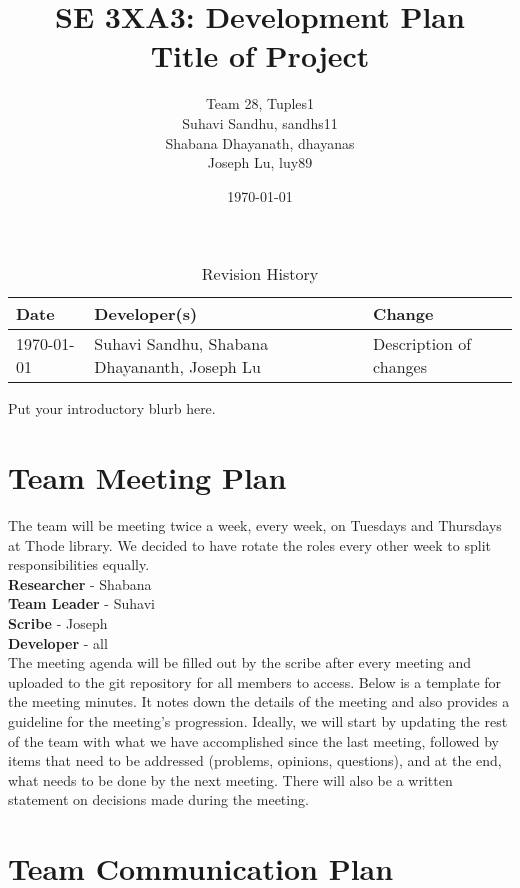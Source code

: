 \documentclass{article}
\title{SE 3XA3: Development Plan\\Title of Project}
\author{Team 28, Tuples1
		\\ Suhavi Sandhu, sandhs11
		\\ Shabana Dhayanath, dhayanas
		\\ Joseph Lu, luy89
}
\date{\today}
\begin{document}
\begin{table}[hp]
\caption{Revision History} \label{TblRevisionHistory}
\begin{tabularx}{\textwidth}{llX}
\toprule
\textbf{Date} & \textbf{Developer(s)} & \textbf{Change}\\
\midrule
\today & Suhavi Sandhu, Shabana Dhayananth, Joseph Lu & Description of changes\\
\bottomrule
\end{tabularx}
\end{table}

\newpage

\maketitle

Put your introductory blurb here.

\section{Team Meeting Plan}
The team will be meeting twice a week, every week, on Tuesdays and Thursdays at Thode library. We decided to have rotate the roles every other week to split responsibilities equally.\\

\textbf{Researcher} - Shabana\\
\textbf{Team Leader} - Suhavi\\
\textbf{Scribe} - Joseph\\
\textbf{Developer} - all\\

The meeting agenda will be filled out by the scribe after every meeting and uploaded to the git repository for all members to access. Below is a template for the meeting minutes. It notes down the details of the meeting and also provides a guideline for the meeting’s progression. Ideally, we will start by updating the rest of the team with what we have accomplished since the last meeting, followed by items that need to be addressed (problems, opinions, questions), and at the end, what needs to be done by the next meeting. There will also be a written statement on decisions made during the meeting.

\section{Team Communication Plan}
\end{document}
